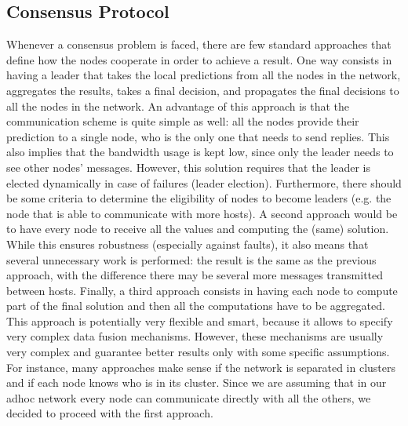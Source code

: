 \documentclass[10pt,conference,compsocconf]{IEEEtran}
\begin{document}
\subsection{Consensus Protocol}
Whenever a consensus problem is faced, there are few standard approaches that define how the nodes cooperate in order to achieve a result. One way consists in having a leader that takes the local predictions from all the nodes in the network, aggregates the results, takes a final decision, and propagates the final decisions to all the nodes in the network. An advantage of this approach is that the communication scheme is quite simple as well: all the nodes provide their prediction to a single node, who is the only one that needs to send replies. This also implies that the bandwidth usage is kept low, since only the leader needs to see other nodes' messages. However, this solution requires that the leader is elected dynamically in case of failures (leader election). Furthermore, there should be some criteria to determine the eligibility of nodes to become leaders (e.g. the node that is able to communicate with more hosts). A second approach would be to have every node to receive all the values and computing the (same) solution. While this ensures robustness (especially against faults), it also means that several unnecessary work is performed: the result is the same as the previous approach, with the difference there may be several more messages transmitted between hosts. Finally, a third approach consists in having each node to compute part of the final solution and then all the computations have to be aggregated. This approach is potentially very flexible and smart, because it allows to specify very complex data fusion mechanisms. However, these mechanisms are usually very complex and guarantee better results only with some specific assumptions. For instance, many approaches make sense if the network is separated in clusters and if each node knows who is in its cluster. Since we are assuming that in our adhoc network every node can communicate directly with all the others, we decided to proceed with the first approach.
\end{document}
